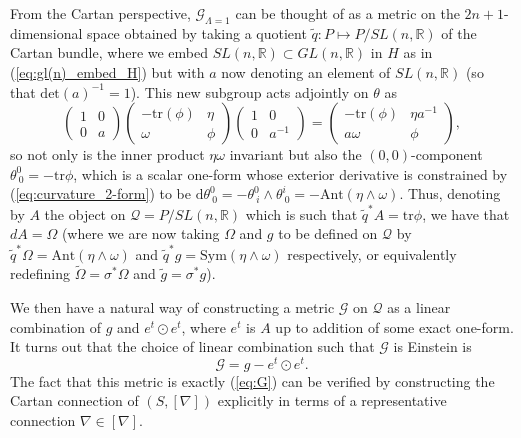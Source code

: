 From the Cartan perspective, $\mathcal{G}_{\Lambda=1}$ can be thought
of as a metric on the $2n+1$-dimensional space obtained by taking
a quotient $\tilde{q}:P\mapsto P/SL(n,\mathbb{R})$ of the Cartan
bundle, where we embed $SL(n,\mathbb{R})\subset GL(n,\mathbb{R})$
in $H$ as in (\ref{eq:gl(n)_embed_H}) but with $a$ now denoting
an element of $SL(n,\mathbb{R})$ (so that $\mathrm{det}(a)^{-1}=1$).
This new subgroup acts adjointly on $\theta$ as
\[
\begin{pmatrix}1 & 0\\
0 & a
\end{pmatrix}\begin{pmatrix}-\mathrm{tr}(\phi) & \eta\\
\omega & \phi
\end{pmatrix}\begin{pmatrix}1 & 0\\
0 & a^{-1}
\end{pmatrix}=\begin{pmatrix}-\mathrm{tr}(\phi) & \eta a^{-1}\\
a\omega & \phi
\end{pmatrix},
\]
so not only is the inner product $\eta\omega$ invariant but also
the $(0,0)$-component $\theta_{\ 0}^{0}=\mathrm{-tr}\phi$, which
is a scalar one-form whose exterior derivative is constrained by (\ref{eq:curvature_2-form})
to be $\mathrm{d}\theta_{\ 0}^{0}=-\theta_{\ i}^{0}\wedge\theta_{\ 0}^{i}=-\mathrm{Ant}(\eta\wedge\omega)$.
Thus, denoting by ${A}$ the object on $\mathcal{Q}=P/SL(n,\mathbb{R})$
which is such that $\tilde{q}^{*}A=\mathrm{tr}\phi$, we have that
${d}A=\Omega$ (where we are now taking $\Omega$ and $g$
to be defined on $\mathcal{Q}$ by $\tilde{q}^{*}\Omega=\mathrm{Ant}(\eta\wedge\omega)$
and $\tilde{q}^{*}g=\mathrm{Sym}(\eta\wedge\omega)$ respectively,
or equivalently redefining $\tilde{\Omega}=\sigma^{*}\Omega$ and
$\tilde{g}=\sigma^{*}g$).

We then have a natural way of constructing a metric $\mathcal{G}$
on $\mathcal{Q}$ as a linear combination of $g$ and $e^{t}\odot e^{t}$,
where $e^{t}$ is $A$ up to addition of some exact one-form. It turns
out that the choice of linear combination such that $\mathcal{G}$
is Einstein is 
\[
\mathcal{G}=g-e^{t}\odot e^{t}.
\]
The fact that this metric is exactly (\ref{eq:G}) can be verified
by constructing the Cartan connection of $(S,[\nabla])$ explicitly
in terms of a representative connection $\nabla\in[\nabla]$.

